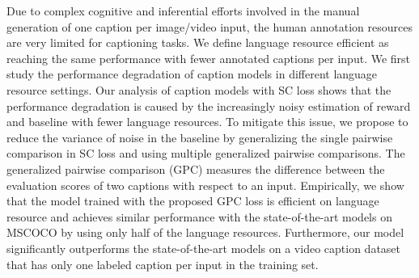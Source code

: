Due to complex cognitive and inferential efforts involved in the manual generation of one caption per image/video input, the human annotation resources are very limited for captioning tasks. We define language resource efficient as reaching the same performance with fewer annotated captions per input. We first study the performance degradation of caption models in different language resource settings. Our analysis of caption models with SC loss shows that the performance degradation is caused by the increasingly noisy estimation of reward and baseline with fewer language resources. To mitigate this issue, we propose to reduce the variance of noise in the baseline by generalizing the single pairwise comparison in SC loss and using multiple generalized pairwise comparisons. The generalized pairwise comparison (GPC) measures the difference between the evaluation scores of two captions with respect to an input. Empirically, we show that the model trained with the proposed GPC loss is efficient on language resource and achieves similar performance with the state-of-the-art models on MSCOCO by using only half of the language resources. Furthermore, our model significantly outperforms the state-of-the-art models on a video caption dataset that has only one labeled caption per input in the training set.

